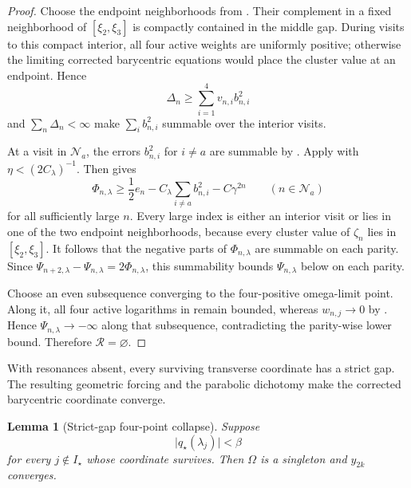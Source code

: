 \documentclass[11pt]{article}
\newtheorem{lemma}{Lemma}[section]
\begin{document}
\begin{proof}
Choose the endpoint neighborhoods from .  Their
complement in a fixed neighborhood of \([\xi_2,\xi_3]\) is compactly
contained in the middle gap.  During visits to this compact interior, all
four active weights are uniformly positive; otherwise the limiting
corrected barycentric equations would place the cluster value at an
endpoint.  Hence
\[
 \Delta_n\geq\sum_{i=1}^4v_{n,i}b_{n,i}^2
\tag{64}\label{eq:interior-energy}
\]
and \(\sum_n\Delta_n<\infty\) make
\(\sum_i b_{n,i}^2\) summable over the interior visits.

At a visit in \(\mathcal N_a\), the errors \(b_{n,i}^2\) for
\(i\neq a\) are summable by
.  Apply
 with
\(\eta<(2C_\lambda)^{-1}\).  Then
 gives
\[
 \Phi_{n,\lambda}
 \geq\frac12e_n
 -C_\lambda\sum_{i\neq a}b_{n,i}^2-C\gamma^{2n}
 \qquad(n\in\mathcal N_a)
\tag{65}\label{eq:Phi-endpoint}
\]
for all sufficiently large \(n\).  Every large index is either an interior
visit or lies in one of the two endpoint neighborhoods, because every
cluster value of \(\zeta_n\) lies in \([\xi_2,\xi_3]\).  It follows that
the negative parts of \(\Phi_{n,\lambda}\) are summable on each parity.
Since \(\Psi_{n+2,\lambda}-\Psi_{n,\lambda}=2\Phi_{n,\lambda}\), this
summability bounds \(\Psi_{n,\lambda}\) below on each parity.

Choose an even subsequence converging to the four-positive omega-limit
point.  Along it, all four active logarithms in  remain
bounded, whereas \(w_{n,j}\to0\) by
.  Hence
\(\Psi_{n,\lambda}\to-\infty\) along that subsequence, contradicting the
parity-wise lower bound.  Therefore \(\mathcal R=\varnothing\).
\end{proof}

With resonances absent, every surviving transverse coordinate has a strict
gap.  The resulting geometric forcing and the parabolic dichotomy make the
corrected barycentric coordinate converge.

\begin{lemma}[Strict-gap four-point collapse]
\label{lem:strict-gap-collapse}
Suppose
\[
 \lvert q_\star(\lambda_j)\rvert<\beta
\]
for every \(j\notin I_\star\) whose coordinate survives.  Then
\(\Omega\) is a singleton and \(y_{2k}\) converges.
\end{lemma}
\end{document}
